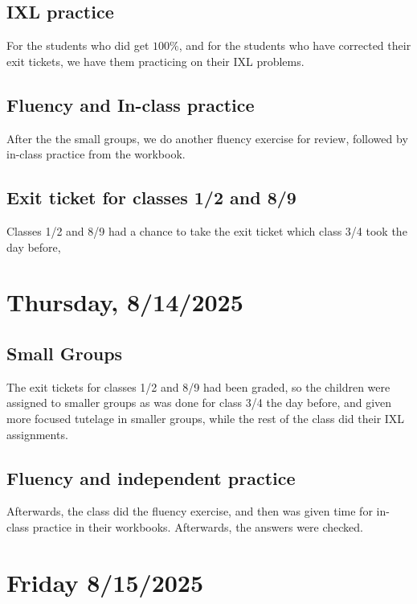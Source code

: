 \documentclass[11pt]{elegantbook}
\begin{document}
\section*{IXL practice}

For the students who did get $100\%$, and for the students who have
corrected their exit tickets, we have them practicing on their IXL
problems.

\section*{Fluency and In-class practice}

After the the small groups, we do another fluency exercise for review,
followed by in-class practice from the workbook.

\section*{Exit ticket for classes 1/2 and 8/9}

Classes 1/2 and 8/9 had a chance to take the exit ticket which class
3/4 took the day before,



\chapter{Thursday, 8/14/2025}

\section*{Small Groups}

The exit tickets for classes 1/2 and 8/9 had been graded, so the children
were assigned to smaller groups as was done for class 3/4 the day before, and
given more focused tutelage in smaller groups, while the rest of the class
did their IXL assignments.

\section*{Fluency and independent practice}

Afterwards, the class did the fluency exercise, and then was given
time for in-class practice in their workbooks.  Afterwards, the answers
were checked.


\chapter{Friday 8/15/2025}
\end{document}
